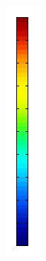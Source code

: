 \documentclass[mathserif]{beamer}
\begin{document}
\begin{frame}
\begin{figure}[H]
\begin{subfigure}[H]{0.02\textwidth}
		\includegraphics[width=\textwidth]{images/timedep-multiscale/stability/scale.jpg}

\end{subfigure}
\end{figure}
\end{frame}
\end{document}
